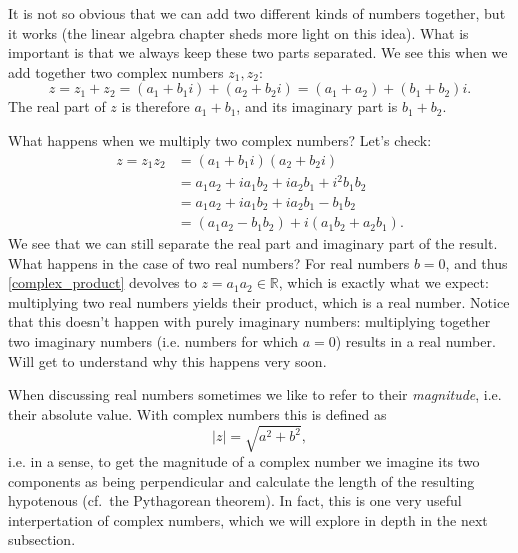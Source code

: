It is not so obvious that we can add two different kinds of numbers together, but it works (the linear algebra chapter sheds more light on this idea). What is important is that we always keep these two parts separated. We see this when we add together two complex numbers $z_{1},z_{2}$:
\begin{equation}
	z = z_{1}+z_{2} = \left( a_{1}+b_{1}i \right) + \left( a_{2}+b_{2}i \right) = \left( a_{1}+a_{2} \right) + \left( b_{1}+b_{2} \right)i.
	\label{eq:complex_addition}
\end{equation}
The real part of $z$ is therefore $a_{1}+b_{1}$, and its imaginary part is $b_{1}+b_{2}$.

What happens when we multiply two complex numbers? Let's check:
\begin{align}
	z = z_{1}z_{2} &= \left( a_{1}+b_{1}i \right)\left( a_{2}+b_{2}i \right)\nonumber\\
	&= a_{1}a_{2} + ia_{1}b_{2} + ia_{2}b_{1} + i^{2}b_{1}b_{2}\nonumber\\
	&= a_{1}a_{2} + ia_{1}b_{2} + ia_{2}b_{1} - b_{1}b_{2}\nonumber\\
	&= \left( a_{1}a_{2} - b_{1}b_{2} \right) + i\left( a_{1}b_{2} + a_{2}b_{1} \right).
	\label{eq:complex_product}
\end{align}
We see that we can still separate the real part and imaginary part of the result. What happens in the case of two real numbers? For real numbers $b=0$, and thus \eqref{complex_product} devolves to $z=a_{1}a_{2}\in\mathbb{R}$, which is exactly what we expect: multiplying two real numbers yields their product, which is a real number. Notice that this doesn't happen with purely imaginary numbers: multiplying together two imaginary numbers (i.e. numbers for which $a=0$) results in a real number. Will get to understand why this happens very soon.

When discussing real numbers sometimes we like to refer to their \textit{magnitude}, i.e. their absolute value. With complex numbers this is defined as
\begin{equation}
	|z| = \sqrt{a^{2}+b^{2}},
	\label{eq:complex_magnitude}
\end{equation}
i.e. in a sense, to get the magnitude of a complex number we imagine its two components as being perpendicular and calculate the length of the resulting hypotenous (cf.\ the Pythagorean theorem). In fact, this is one very useful interpertation of complex numbers, which we will explore in depth in the next subsection.

